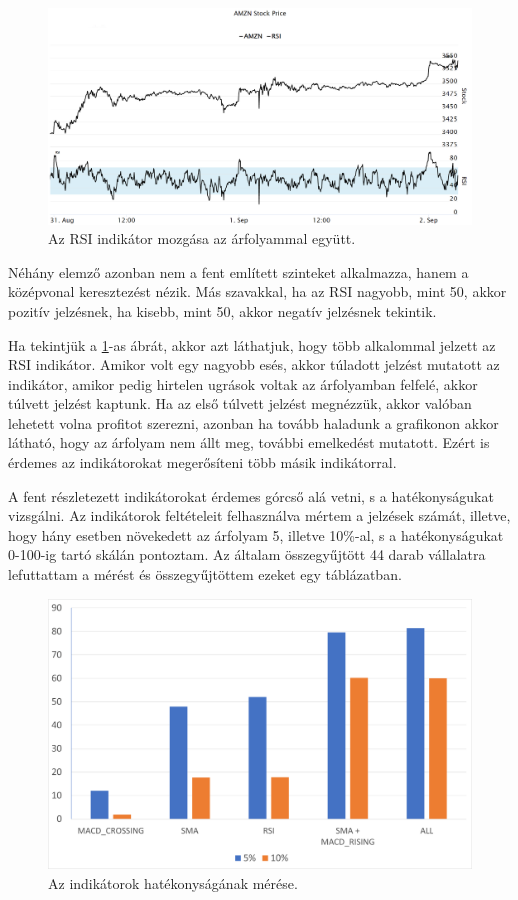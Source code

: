 \begin{figure}[ht]
\centering
\includegraphics[width=\textwidth]{images/RSI.png}
\caption{Az RSI indikátor mozgása az árfolyammal együtt.}
\label{fig:rsi}
\end{figure}
\noindent Néhány elemző azonban nem a fent említett szinteket alkalmazza, hanem a középvonal keresztezést nézik. Más szavakkal, ha az RSI nagyobb, mint 50, akkor pozitív jelzésnek, ha kisebb, mint 50, akkor negatív jelzésnek tekintik.

Ha tekintjük a \ref{fig:rsi}-as ábrát, akkor azt láthatjuk, hogy több alkalommal jelzett az RSI indikátor. Amikor volt egy nagyobb esés, akkor túladott jelzést mutatott az indikátor, amikor pedig hirtelen ugrások voltak az árfolyamban felfelé, akkor túlvett jelzést kaptunk. Ha az első túlvett jelzést megnézzük, akkor valóban lehetett volna profitot szerezni, azonban ha tovább haladunk a grafikonon akkor látható, hogy az árfolyam nem állt meg, további emelkedést mutatott. Ezért is érdemes az indikátorokat megerősíteni több másik indikátorral.

A fent részletezett indikátorokat érdemes górcső alá vetni, s a hatékonyságukat vizsgálni. Az indikátorok feltételeit felhasználva mértem a jelzések számát, illetve, hogy hány esetben növekedett az árfolyam 5, illetve 10\%-al, s a hatékonyságukat 0-100-ig tartó skálán pontoztam. Az általam összegyűjtött 44 darab vállalatra lefuttattam a mérést és összegyűjtöttem ezeket egy táblázatban.
\begin{figure}[ht]
\centering
\includegraphics[scale=0.35]{images/indicator_test.png}
\caption{Az indikátorok hatékonyságának mérése.}
\label{fig:indicator_test}
\end{figure}


